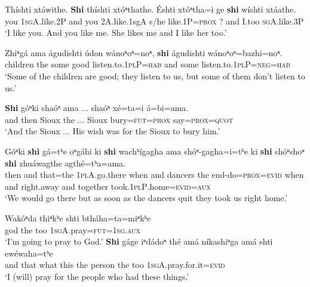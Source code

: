 \documentclass[output=paper]{LSP/langsci}
\begin{document}
\begin{exe}
\ex 
\gll Th\'ishti  xt\'awithe.  \textbf{Shi} th\'ishti xt\'oⁿthathe.  \'Eshti  xt\'oⁿtha=i  ge \textbf{shi}  w\'ishti xt\'aathe.\\
 	you   	\textsc{1sgA}.like.2P  and 	you     	2A.like.{1sgA}  	s/he   	like.1P=\textsc{prox}  	?  	and  	I.too  	\textsc{sgA}.like.3P\\
\trans `I like you.  And you like me.  She likes me and I like her too.'

\ex 
\gll  Zhiⁿg\'a  ama \'agudishti \'udon  w\'anoⁿoⁿ=noⁿ, \textbf{shi}  \'agudishti  w\'anoⁿoⁿ=bazhi=noⁿ.\\
children 	the 	some        	good  	listen.to.\textsc{1plP=hab} 	and some listen.to.\textsc{1plP}=\textsc{neg=hab}\\
\trans `Some of the children are good; they listen to us, but some of them don't listen to us.'

\ex 
\gll  \textbf{Shi}  g\'oⁿki 	sha\'oⁿ 	ama ... sha\'oⁿ  	x\'e=ta=i  \'a=bi=ama.\\          
    	and  	then 	Sioux 	the 	 ... Sioux  	bury=\textsc{fut=prox} 	say=\textsc{prox=quot}\\
\trans `And the Sioux ...  His wish was for the Sioux to bury him.'

\ex 
\gll  G\'oⁿki 	\textbf{shi} 	g\'a=tʰe  oⁿg\'ahi  ki    \textbf{shi} 	wachʰ\'igagha ama  sh\'oⁿ-gagha=i=tʰe 	ki 	\textbf{shi} 	sh\'oⁿshoⁿ    \textbf{shi} 	zhu\'awagthe 	agth\'e=tʰa=ama.\\
    	then 	and that=the \textsc{1plA}.go.there when 	and dancers the end-do=\textsc{prox=evid} when 	and right.away and 	together 	took.\textsc{1plP}.home=\textsc{evid=aux}\\
\trans `We would go there but as soon as the dancers quit they took us right home.'

\ex \begin{xlist}
\ex
\gll  Wak\'oⁿda 	thiⁿkʰe 	shti  	bth\'aha=ta=miⁿkʰe\\
	god          	the       	too  	\textsc{1sgA}.pray=\textsc{fut=1sg.aux}\\
\trans `I'm going to pray to God.'
\ex
\gll	\textbf{Shi} g\'age 	iⁿd\'adoⁿ th\'e 	am\'a 	n\'ikashiⁿga 	am\'a 	shti ew\'ewaha=tʰe\\
and 	that   what     	this 	the 	person    	the 	too 	\textsc{1sgA}.pray.for.it=\textsc{evid}\\
\trans `I (will) pray for the people who had these things.'


\end{xlist}
\end{exe}
\end{document}
